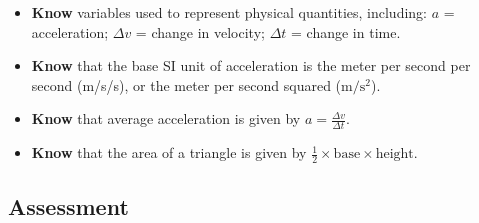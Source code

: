 \documentclass[dvipsnames]{article}
\begin{document}
\begin{itemize}[itemsep=0pt,topsep=-3pt]
    \item \textbf{Know} variables used to represent physical quantities, including: $a$ = acceleration; $\Delta v$ = change in velocity; $\Delta t$ = change in time.
    \item \textbf{Know} that the base SI unit of acceleration is the meter per second per second (m/s/s), or the meter per second squared ($\mathrm{m/s^2}$).
    \item \textbf{Know} that average acceleration is given by $\displaystyle a = \frac{\Delta v}{\Delta t}$.
    \item \textbf{Know} that the area of a triangle is given by $\frac{1}{2}\times \text{base} \times \text{height}$.
\end{itemize}



\subsection*{Assessment}
\end{document}

